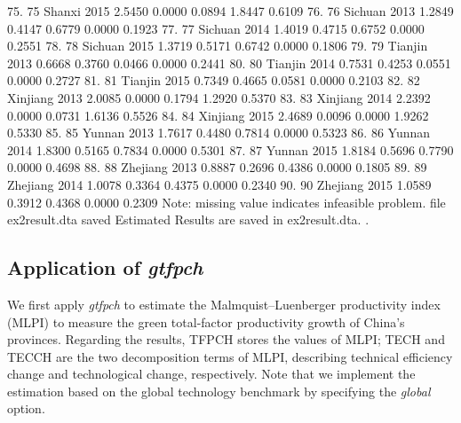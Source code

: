 75. {\VBAR}  75           Shanxi   2015   2.5450   0.0000   0.0894   1.8447   0.6109 {\VBAR}
76. {\VBAR}  76          Sichuan   2013   1.2849   0.4147   0.6779   0.0000   0.1923 {\VBAR}
77. {\VBAR}  77          Sichuan   2014   1.4019   0.4715   0.6752   0.0000   0.2551 {\VBAR}
78. {\VBAR}  78          Sichuan   2015   1.3719   0.5171   0.6742   0.0000   0.1806 {\VBAR}
79. {\VBAR}  79          Tianjin   2013   0.6668   0.3760   0.0466   0.0000   0.2441 {\VBAR}
80. {\VBAR}  80          Tianjin   2014   0.7531   0.4253   0.0551   0.0000   0.2727 {\VBAR}
81. {\VBAR}  81          Tianjin   2015   0.7349   0.4665   0.0581   0.0000   0.2103 {\VBAR}
82. {\VBAR}  82         Xinjiang   2013   2.0085   0.0000   0.1794   1.2920   0.5370 {\VBAR}
83. {\VBAR}  83         Xinjiang   2014   2.2392   0.0000   0.0731   1.6136   0.5526 {\VBAR}
84. {\VBAR}  84         Xinjiang   2015   2.4689   0.0096   0.0000   1.9262   0.5330 {\VBAR}
85. {\VBAR}  85           Yunnan   2013   1.7617   0.4480   0.7814   0.0000   0.5323 {\VBAR}
86. {\VBAR}  86           Yunnan   2014   1.8300   0.5165   0.7834   0.0000   0.5301 {\VBAR}
87. {\VBAR}  87           Yunnan   2015   1.8184   0.5696   0.7790   0.0000   0.4698 {\VBAR}
88. {\VBAR}  88         Zhejiang   2013   0.8887   0.2696   0.4386   0.0000   0.1805 {\VBAR}
89. {\VBAR}  89         Zhejiang   2014   1.0078   0.3364   0.4375   0.0000   0.2340 {\VBAR}
90. {\VBAR}  90         Zhejiang   2015   1.0589   0.3912   0.4368   0.0000   0.2309 {\VBAR}
{\BLC}
Note: missing value indicates infeasible problem.
file ex2result.dta saved
{\smallskip}
Estimated Results are saved in ex2result.dta.
{\smallskip}
. 


\subsection{Application of \textit{gtfpch}}

We first apply \textit{gtfpch} to estimate the Malmquist–Luenberger productivity index (MLPI) to measure the green total-factor productivity growth of China's provinces. Regarding the results, TFPCH stores the values of MLPI; TECH and TECCH are the two decomposition terms of MLPI, describing technical efficiency change and technological change, respectively. Note that we implement the estimation based on the global technology benchmark by specifying the \textit{global} option.

